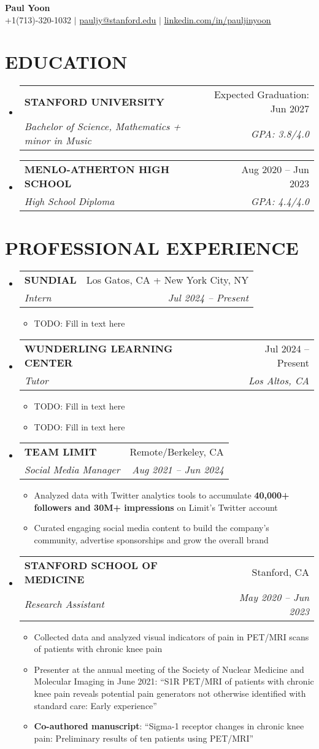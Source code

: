 \documentclass[letterpaper,11pt]{article}
\makeatletter
\newcommand{\resumeItem}[1]{
  \item\small{
    {#1 \vspace{-4pt}}
  }
}
\newcommand{\resumeSubheading}[4]{
  \vspace{-3pt}\item
    \begin{tabular*}{0.97\textwidth}[t]{l@{\extracolsep{\fill}}r}
      \vspace{-2pt}
      \textbf{#1} & \small#2 \\
      \textit{\small#3} & \textit{\small #4} \\
    \end{tabular*}\vspace{-10pt}
}
\newcommand{\resumeSubHeadingListStart}{\begin{itemize}[leftmargin=0in, label={}]}
\newcommand{\resumeSubHeadingListEnd}{\end{itemize}}
\newcommand{\resumeItemListStart}{\begin{itemize}[leftmargin=0.2in]}
\newcommand{\resumeItemListEnd}{\end{itemize}\vspace{-5pt}}
\makeatother
\begin{document}
\begin{center}
    \textbf{\fontsize{17}{17}\selectfont Paul Yoon} \\
      \vspace{1pt}
      \small +1(713)-320-1032 $|$
      \href{mailto:pauljy@stanford.edu}{\underline{pauljy@stanford.edu}} $|$
      \href{https://linkedin.com/in/pauljinyoon{}}{\underline{linkedin.com/in/pauljinyoon}} 
\end{center}


\section{\textbf{EDUCATION}}
  \resumeSubHeadingListStart
    \resumeSubheading
      {STANFORD UNIVERSITY}{Expected Graduation: Jun 2027}
      {Bachelor of Science, Mathematics + minor in Music}{GPA: 3.8/4.0}
      \vspace{5pt}
    \resumeSubheading
    {MENLO-ATHERTON HIGH SCHOOL}{Aug 2020 -- Jun 2023}
    {High School Diploma}{GPA: 4.4/4.0}
  \resumeSubHeadingListEnd

  \section{\textbf{PROFESSIONAL EXPERIENCE}}
  \resumeSubHeadingListStart

    \resumeSubheading
      {SUNDIAL}{Los Gatos, CA + New York City, NY}
      {Intern}{Jul 2024 -- Present}
      \resumeItemListStart
        \resumeItem{TODO: Fill in text here}
      \resumeItemListEnd
      
    \resumeSubheading
      {WUNDERLING LEARNING CENTER}{Jul 2024 -- Present}
      {Tutor}{Los Altos, CA}
      \resumeItemListStart
        \resumeItem{TODO: Fill in text here}
        \resumeItem{TODO: Fill in text here}
      \resumeItemListEnd
    
    \resumeSubheading
      {TEAM LIMIT}{Remote/Berkeley, CA}
      {Social Media Manager}{Aug 2021 -- Jun 2024}
      \resumeItemListStart
    \resumeItem{Analyzed data with Twitter analytics tools to accumulate \textbf{40,000+ followers and 30M+ impressions} on Limit’s Twitter account}
        \resumeItem{Curated engaging social media content to build the company’s community, advertise sponsorships and grow the overall brand}
    \resumeItemListEnd

    \resumeSubheading
      {STANFORD SCHOOL OF MEDICINE}{Stanford, CA}
      {Research Assistant}{May 2020 -- Jun 2023}
      \resumeItemListStart
        \resumeItem{Collected data and analyzed visual indicators of pain in PET/MRI scans of patients with chronic knee pain}
        \resumeItem{Presenter at the annual meeting of the Society of Nuclear Medicine and Molecular Imaging in June 2021: “S1R PET/MRI of
patients with chronic knee pain reveals potential pain generators not otherwise identified with standard care: Early experience”}
\resumeItem{\textbf{Co-authored manuscript}: “Sigma-1 receptor changes in chronic knee pain: Preliminary results of ten patients using PET/MRI”}
      \resumeItemListEnd
      \vspace{-4pt}
  \resumeSubHeadingListEnd
  
\end{document}
